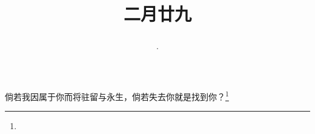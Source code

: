 \title{\date[d=7,m=4,y=2024][year:cn-y,年,month:cn,day:cn,日,·,weekday]·二月廿九 }
倘若我因属于你而将驻留与永生，倘若失去你就是找到你？\footnote{ }

